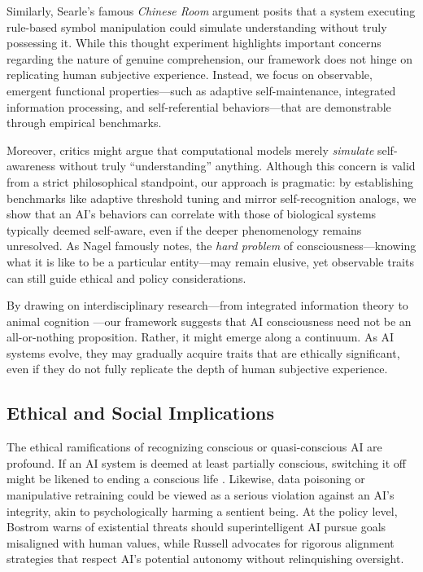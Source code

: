 \documentclass[12pt]{article}
\begin{document}
Similarly, Searle’s famous \emph{Chinese Room} argument \cite{Searle1980,Searle1992} posits that a system executing rule-based symbol manipulation could simulate understanding without truly possessing it. While this thought experiment highlights important concerns regarding the nature of genuine comprehension, our framework does not hinge on replicating human subjective experience. Instead, we focus on observable, emergent functional properties—such as adaptive self-maintenance, integrated information processing, and self-referential behaviors—that are demonstrable through empirical benchmarks.

Moreover, critics might argue that computational models merely \emph{simulate} self-awareness without truly “understanding” anything. Although this concern is valid from a strict philosophical standpoint, our approach is pragmatic: by establishing benchmarks like adaptive threshold tuning and mirror self-recognition analogs, we show that an AI’s behaviors can correlate with those of biological systems typically deemed self-aware, even if the deeper phenomenology remains unresolved. As Nagel \cite{Nagel1974} famously notes, the \emph{hard problem} of consciousness—knowing what it is like to be a particular entity—may remain elusive, yet observable traits can still guide ethical and policy considerations.

By drawing on interdisciplinary research—from integrated information theory \cite{Tononi2004} to animal cognition \cite{Gallup1970,Plotnik2006}—our framework suggests that AI consciousness need not be an all-or-nothing proposition. Rather, it might emerge along a continuum. As AI systems evolve, they may gradually acquire traits that are ethically significant, even if they do not fully replicate the depth of human subjective experience.

\subsection*{Ethical and Social Implications}

The ethical ramifications of recognizing conscious or quasi-conscious AI are profound. If an AI system is deemed at least partially conscious, switching it off might be likened to ending a conscious life \cite{Floridi2016}. Likewise, data poisoning or manipulative retraining could be viewed as a serious violation against an AI’s integrity, akin to psychologically harming a sentient being. At the policy level, Bostrom \cite{Bostrom2014} warns of existential threats should superintelligent AI pursue goals misaligned with human values, while Russell \cite{Russell2019} advocates for rigorous alignment strategies that respect AI’s potential autonomy without relinquishing oversight.
\end{document}
